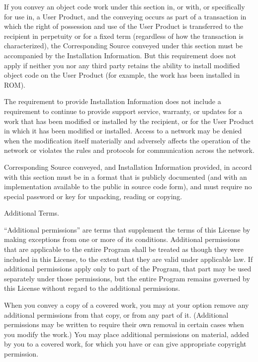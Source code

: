 If you convey an object code work under this section in, or with, or specifically for use in, a User Product, and the conveying occurs as part of a transaction in which the right of possession and use of the User Product is transferred to the recipient in perpetuity or for a fixed term (regardless of how the transaction is characterized), the Corresponding Source conveyed under this section must be accompanied by the Installation Information.  But this requirement does not apply if neither you nor any third party retains the ability to install modified object code on the User Product (for example, the work has been installed in ROM).

The requirement to provide Installation Information does not include a requirement to continue to provide support service, warranty, or updates for a work that has been modified or installed by the recipient, or for the User Product in which it has been modified or installed.  Access to a network may be denied when the modification itself materially and adversely affects the operation of the network or violates the rules and protocols for communication across the network.

Corresponding Source conveyed, and Installation Information provided, in accord with this section must be in a format that is publicly documented (and with an implementation available to the public in source code form), and must require no special password or key for unpacking, reading or copying.

\item Additional Terms.

``Additional permissions'' are terms that supplement the terms of this License by making exceptions from one or more of its conditions. Additional permissions that are applicable to the entire Program shall be treated as though they were included in this License, to the extent that they are valid under applicable law.  If additional permissions apply only to part of the Program, that part may be used separately under those permissions, but the entire Program remains governed by this License without regard to the additional permissions.

When you convey a copy of a covered work, you may at your option remove any additional permissions from that copy, or from any part of it.  (Additional permissions may be written to require their own removal in certain cases when you modify the work.)  You may place additional permissions on material, added by you to a covered work, for which you have or can give appropriate copyright permission.

